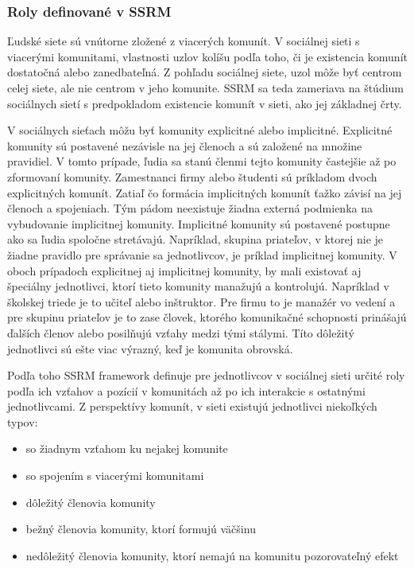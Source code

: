 \documentclass[slovak,master,public,dept460,male,cpdeclaration,oneside]{diploma}
\begin{document}
\subsubsection{Roly definované v SSRM}
Ľudské siete sú vnútorne zložené z viacerých komunít. V sociálnej sieti s viacerými komunitami, vlastnosti uzlov kolíšu podľa toho, či je existencia komunít dostatočná alebo zanedbateľná. Z pohľadu sociálnej siete, uzol môže byť centrom celej siete, ale nie centrom v jeho komunite. SSRM sa teda zameriava na štúdium sociálnych sietí s predpokladom existencie komunít v sieti, ako jej základnej črty.

V sociálnych sieťach môžu byť komunity explicitné alebo implicitné. Explicitné komunity sú postavené nezávisle na jej členoch a sú založené na množine pravidiel. V tomto prípade, ľudia sa stanú členmi tejto komunity častejšie až po zformovaní komunity. Zamestnanci firmy alebo študenti sú príkladom dvoch explicitných komunít. Zatiaľ čo formácia implicitných komunít ťažko závisí na jej členoch a spojeniach. Tým pádom neexistuje žiadna externá podmienka na vybudovanie implicitnej komunity. Implicitné komunity sú postavené postupne ako sa ľudia spoločne stretávajú. Napríklad, skupina priateľov, v ktorej nie je žiadne pravidlo pre správanie sa jednotlivcov, je príklad implicitnej komunity. V oboch prípadoch explicitnej aj implicitnej komunity, by mali existovať aj špeciálny jednotlivci, ktorí tieto komunity manažujú a kontrolujú. Napríklad v školskej triede je to učiteľ alebo inštruktor. Pre firmu to je manažér vo vedení a pre skupinu priateľov je to zase človek, ktorého komunikačné schopnosti prinášajú ďalších členov alebo posilňujú vzťahy medzi tými stálymi. Títo dôležitý jednotlivci sú ešte viac výrazný, keď je komunita obrovská.


Podľa toho SSRM framework definuje pre jednotlivcov v sociálnej sieti určité roly podľa ich vzťahov a pozícií v komunitách až po ich interakcie s ostatnými jednotlivcami. Z perspektívy komunít, v sieti existujú jednotlivci niekoľkých typov:

\begin{itemize}
\item so žiadnym vzťahom ku nejakej komunite
\item so spojením s viacerými komunitami
\item dôležitý členovia komunity
\item bežný členovia komunity, ktorí formujú väčšinu
\item nedôležitý členovia komunity, ktorí nemajú na komunitu pozorovateľný efekt
\end{itemize} 
\end{document}
